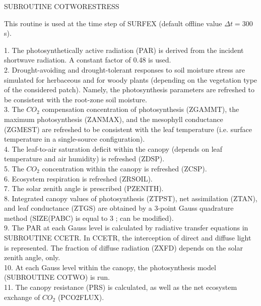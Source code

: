 {SUBROUTINE COTWORESTRESS

This routine is used at the time step of SURFEX (default offline value
$\Delta t =300$ s).

1. The photosynthetically active radiation (PAR) is derived from the incident shortwave
radiation. A constant factor of 0.48 is used. \\

2. Drought-avoiding and drought-tolerant responses to soil moisture stress are simulated for
herbaceous and for woody plants (depending on the vegetation type of the considered patch).
Namely, the photosynthesis parameters are refreshed to be consistent with the root-zone soil
moisture. \\

3. The $CO_{2}$ compensation concentration of photosynthesis (ZGAMMT), the maximum
photosynthesis (ZANMAX), and the mesophyll conductance (ZGMEST) are refreshed to be
consistent with the leaf temperature (i.e. surface temperature in a single-source configuration). \\

4. The leaf-to-air saturation deficit within the canopy (depends on leaf temperature and air
humidity) is refreshed (ZDSP). \\

5. The $CO_{2}$ concentration within the canopy is refreshed (ZCSP). \\

6. Ecosystem respiration is refreshed (ZRSOIL). \\

7. The solar zenith angle is prescribed (PZENITH). \\

8. Integrated canopy values of photosynthesis (ZTPST), net assimilation (ZTAN), and leaf
conductance (ZTGS) are obtained by a 3-point Gauss quadrature method (SIZE(PABC) is
equal to 3 ; can be modified). \\

9. The PAR at each Gauss level is calculated by radiative transfer equations in
SUBROUTINE CCETR. In CCETR, the interception of direct and diffuse light is represented.
The fraction of diffuse radiation (ZXFD) depends on the solar zenith angle, only. \\

10. At each Gauss level within the canopy, the photosynthesis model (SUBROUTINE
COTWO) is run. \\

11. The canopy resistance (PRS) is calculated, as well as the net ecosystem exchange of
$CO_{2}$ (PCO2FLUX).





}
